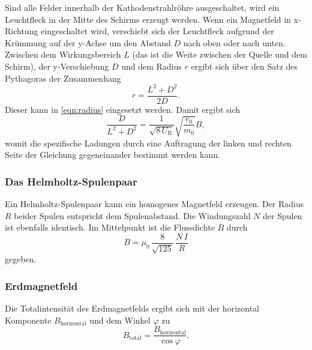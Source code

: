 \noindent Sind alle Felder innerhalb der Kathodenstrahlröhre ausgeschaltet, wird ein Leuchtfleck in der Mitte des Schirms erzeugt werden.  
Wenn ein Magnetfeld in x-Richtung eingeschaltet wird, verschiebt sich 
der Leuchtfleck aufgrund der Krümmung auf der y-Achse 
um den Abstand $D$ nach oben oder nach unten. Zwischen dem Wirkungsbereich $L$ (das ist die Weite 
zwischen der Quelle und dem Schirm), der y-Verschiebung  $D$ und dem 
Radius $r$ ergibt sich über den Satz des Pythagoras der Zusammenhang 
\begin{equation*}
    r = \frac{L^2 + D^2}{2D}.
\end{equation*}
Dieser kann in \eqref{eqn:radius} eingesetzt werden.
Damit ergibt sich  
\begin{equation}
    \frac{D}{L^2 + D^2}= \frac{1}{\sqrt{8 \, U_\text{B}}}\sqrt{\frac{e_\text{0}}{m_\text{0}}} B,
    \label{eqn:Ende}
\end{equation}
womit die spezifische Ladungen durch eine Auftragung der linken und rechten Seite der Gleichung gegeneinander bestimmt werden kann. 

\subsubsection{Das Helmholtz-Spulenpaar}
Ein Helmholtz-Spulenpaar kann ein homogenes Magnetfeld erzeugen.
Der Radius $R$ beider Spulen entspricht dem Spulenabstand.
Die Windungszahl $N$ der Spulen ist ebenfalls identisch.
Im Mittelpunkt ist die Flussdichte $B$ durch
\begin{equation}
    B = \mu_0 \, \frac{8}{\sqrt{125}} \, \frac{N \, I}{R}
    \label{eqn:helmholtz}
\end{equation}
gegeben.

\subsubsection{Erdmagnetfeld}
Die Totalintensität des Erdmagnetfelds ergibt sich mit der horizontal Komponente $B_\text{horizontal}$ und dem Winkel $\varphi$ zu %
\begin{equation}
    B_\text{total} = \frac{B_\text{horizontal}}{\cos{\varphi}}.
    \label{eqn:btotal}
\end{equation}
